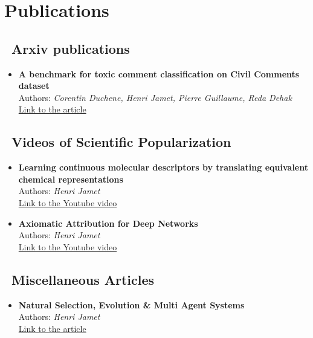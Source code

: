 
\section{Publications}

\newcommand{\arxivicon}{\faicon{book}}
\newcommand{\youtubeicon}{\faicon{youtube}}
\newcommand{\mediumicon}{\faicon{medium}}
\newcommand{\articlesdiversicon}{\faicon{pencil}}

\begin{multicols}{2}

\subsection{\arxivicon~\textcolor{Overleaf_green}{Arxiv publications}}
\begin{itemize}
  \item \textbf{A benchmark for toxic comment classification on Civil Comments dataset}\\
    Authors: \textit{Corentin Duchene, Henri Jamet, Pierre Guillaume, Reda Dehak}\\
  \href{https://arxiv.org/abs/2301.11125}{Link to the article}
\end{itemize}

\subsection{\textcolor{black}{\youtubeicon}~\textcolor{Overleaf_green}{Videos of Scientific Popularization}}
\begin{itemize}
  \item \textbf{Learning continuous molecular descriptors by translating equivalent chemical representations}\\
  Authors: \textit{Henri Jamet}\\
  \href{https://www.youtube.com/watch?v=M9Wd-4E0fNw}{Link to the Youtube video}
  
  \item \textbf{Axiomatic Attribution for Deep Networks}\\
  Authors: \textit{Henri Jamet}\\
  \href{https://www.youtube.com/watch?v=WSeJBEcvVZU}{Link to the Youtube video}
\end{itemize}

\columnbreak

\subsection{\articlesdiversicon~\textcolor{Overleaf_green}{Miscellaneous Articles}}
\begin{itemize}
  \item \textbf{Natural Selection, Evolution \& Multi Agent Systems}\\
  Authors: \textit{Henri Jamet}\\
  \href{https://henri-jamet.notion.site/tude-de-la-S-lection-naturelle-au-moyen-d-une-simulation-multi-agents-88f57904e2a94503a0d91bb99f7d1941}{Link to the article}
  

\end{itemize}
\end{multicols}
